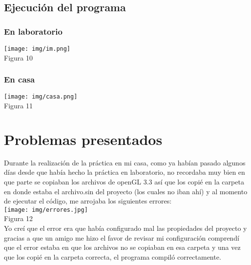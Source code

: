 \documentclass[12pt, a4paper]{article}
\begin{document}
\subsection{Ejecución del programa}	
		\subsubsection{En laboratorio}
			\centering 
			\texttt{[image: img/im.png]}\\[.25cm] %
			Figura 10 \\[.5cm]
		\raggedright 
		\subsubsection{En casa}
		\centering 
		\texttt{[image: img/casa.png]}\\[.25cm] %
			Figura 11 \\[.5cm]
\newpage
 \raggedright 	
\section{Problemas presentados}
\justify
Durante la realización de la práctica en mi casa, como ya habían pasado algunos días desde que había hecho la práctica en laboratorio, no recordaba muy bien en que parte se copiaban los archivos de openGL 3.3 así que los copié en la carpeta en donde estaba el archivo.sin del proyecto (los cuales no iban ahí) y al momento de ejecutar el código, me arrojaba los siguientes errores: \\[.5cm]

\centering 
		\texttt{[image: img/errores.jpg]}\\[.25cm] %
			Figura 12 \\[.5cm]

 \justify	
Yo creí que el error era que había configurado mal las propiedades del proyecto y gracias a que un amigo me hizo el favor de revisar mi configuración comprendí que el error estaba en que los archivos no se copiaban en esa carpeta y una vez que los copié en la carpeta correcta, el programa compiló correctamente.
\\[.5cm]
\end{document}
